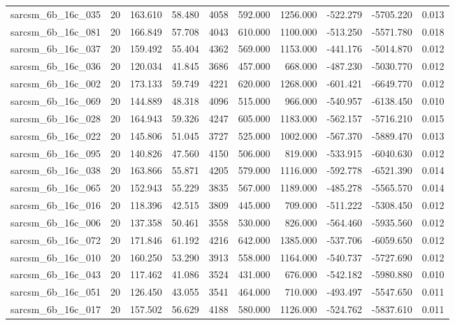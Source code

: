 \begin{tabular}{lrrrrrrrrr}
sarcsm\_6b\_16c\_035 & 20 & 163.610 & 58.480 & 4058 & 592.000 & 1256.000 & -522.279 & -5705.220 & 0.013 \\
sarcsm\_6b\_16c\_081 & 20 & 166.849 & 57.708 & 4043 & 610.000 & 1100.000 & -513.250 & -5571.780 & 0.018 \\
sarcsm\_6b\_16c\_037 & 20 & 159.492 & 55.404 & 4362 & 569.000 & 1153.000 & -441.176 & -5014.870 & 0.012 \\
sarcsm\_6b\_16c\_036 & 20 & 120.034 & 41.845 & 3686 & 457.000 & 668.000 & -487.230 & -5030.770 & 0.012 \\
sarcsm\_6b\_16c\_002 & 20 & 173.133 & 59.749 & 4221 & 620.000 & 1268.000 & -601.421 & -6649.770 & 0.012 \\
sarcsm\_6b\_16c\_069 & 20 & 144.889 & 48.318 & 4096 & 515.000 & 966.000 & -540.957 & -6138.450 & 0.010 \\
sarcsm\_6b\_16c\_028 & 20 & 164.943 & 59.326 & 4247 & 605.000 & 1183.000 & -562.157 & -5716.210 & 0.015 \\
sarcsm\_6b\_16c\_022 & 20 & 145.806 & 51.045 & 3727 & 525.000 & 1002.000 & -567.370 & -5889.470 & 0.013 \\
sarcsm\_6b\_16c\_095 & 20 & 140.826 & 47.560 & 4150 & 506.000 & 819.000 & -533.915 & -6040.630 & 0.012 \\
sarcsm\_6b\_16c\_038 & 20 & 163.866 & 55.871 & 4205 & 579.000 & 1116.000 & -592.778 & -6521.390 & 0.014 \\
sarcsm\_6b\_16c\_065 & 20 & 152.943 & 55.229 & 3835 & 567.000 & 1189.000 & -485.278 & -5565.570 & 0.014 \\
sarcsm\_6b\_16c\_016 & 20 & 118.396 & 42.515 & 3809 & 445.000 & 709.000 & -511.222 & -5308.450 & 0.012 \\
sarcsm\_6b\_16c\_006 & 20 & 137.358 & 50.461 & 3558 & 530.000 & 826.000 & -564.460 & -5935.560 & 0.012 \\
sarcsm\_6b\_16c\_072 & 20 & 171.846 & 61.192 & 4216 & 642.000 & 1385.000 & -537.706 & -6059.650 & 0.012 \\
sarcsm\_6b\_16c\_010 & 20 & 160.250 & 53.290 & 3913 & 558.000 & 1164.000 & -540.737 & -5727.690 & 0.012 \\
sarcsm\_6b\_16c\_043 & 20 & 117.462 & 41.086 & 3524 & 431.000 & 676.000 & -542.182 & -5980.880 & 0.010 \\
sarcsm\_6b\_16c\_051 & 20 & 126.450 & 43.055 & 3541 & 464.000 & 710.000 & -493.497 & -5547.650 & 0.011 \\
sarcsm\_6b\_16c\_017 & 20 & 157.502 & 56.629 & 4188 & 580.000 & 1126.000 & -524.762 & -5837.610 & 0.011 \\

\end{tabular}
